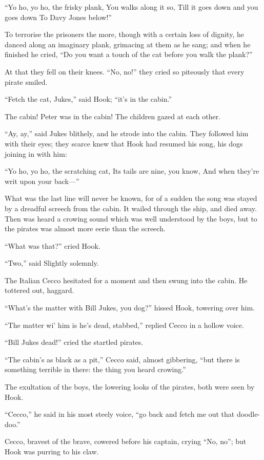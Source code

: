 ``Yo ho, yo ho, the frisky plank,
    You walks along it so,
Till it goes down and you goes down
    To Davy Jones below!''

To terrorise the prisoners the more, though with a certain loss of
dignity, he danced along an imaginary plank, grimacing at them as he
sang; and when he finished he cried, ``Do you want a touch of the cat
before you walk the plank?''

At that they fell on their knees. ``No, no!'' they cried so piteously
that every pirate smiled.

``Fetch the cat, Jukes,'' said Hook; ``it's in the cabin.''

The cabin! Peter was in the cabin! The children gazed at each other.

``Ay, ay,'' said Jukes blithely, and he strode into the cabin. They
followed him with their eyes; they scarce knew that Hook had resumed
his song, his dogs joining in with him:

``Yo ho, yo ho, the scratching cat,
    Its tails are nine, you know,
And when they're writ upon your back—''

What was the last line will never be known, for of a sudden the song
was stayed by a dreadful screech from the cabin. It wailed through the
ship, and died away. Then was heard a crowing sound which was well
understood by the boys, but to the pirates was almost more eerie than
the screech.

``What was that?'' cried Hook.

``Two,'' said Slightly solemnly.

The Italian Cecco hesitated for a moment and then swung into the cabin.
He tottered out, haggard.

``What's the matter with Bill Jukes, you dog?'' hissed Hook, towering
over him.

``The matter wi' him is he's dead, stabbed,'' replied Cecco in a hollow
voice.

``Bill Jukes dead!'' cried the startled pirates.

``The cabin's as black as a pit,'' Cecco said, almost gibbering, ``but
there is something terrible in there: the thing you heard crowing.''

The exultation of the boys, the lowering looks of the pirates, both
were seen by Hook.

``Cecco,'' he said in his most steely voice, ``go back and fetch me out
that doodle-doo.''

Cecco, bravest of the brave, cowered before his captain, crying ``No,
no''; but Hook was purring to his claw.


